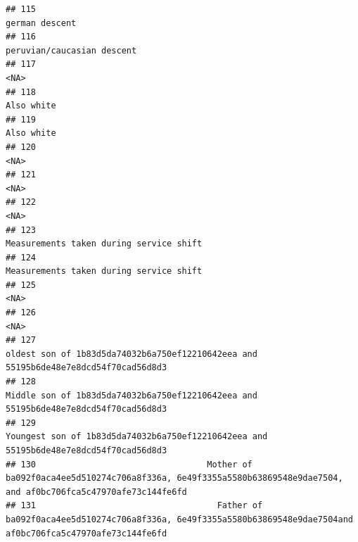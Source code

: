 \documentclass[]{article}
\begin{document}
\begin{verbatim}
## 115                                                                                                                                      german descent
## 116                                                                                                                          peruvian/caucasian descent
## 117                                                                                                                                                <NA>
## 118                                                                                                                                          Also white
## 119                                                                                                                                          Also white
## 120                                                                                                                                                <NA>
## 121                                                                                                                                                <NA>
## 122                                                                                                                                                <NA>
## 123                                                                                                             Measurements taken during service shift
## 124                                                                                                             Measurements taken during service shift
## 125                                                                                                                                                <NA>
## 126                                                                                                                                                <NA>
## 127                                                                 oldest son of 1b83d5da74032b6a750ef12210642eea and 55195b6de48e7e8dcd54f70cad56d8d3
## 128                                                                 Middle son of 1b83d5da74032b6a750ef12210642eea and 55195b6de48e7e8dcd54f70cad56d8d3
## 129                                                               Youngest son of 1b83d5da74032b6a750ef12210642eea and 55195b6de48e7e8dcd54f70cad56d8d3
## 130                                  Mother of ba092f0aca4ee5d510274c706a8f336a, 6e49f3355a5580b63869548e9dae7504, and af0bc706fca5c47970afe73c144fe6fd
## 131                                    Father of ba092f0aca4ee5d510274c706a8f336a, 6e49f3355a5580b63869548e9dae7504and af0bc706fca5c47970afe73c144fe6fd

\end{verbatim}
\end{document}
